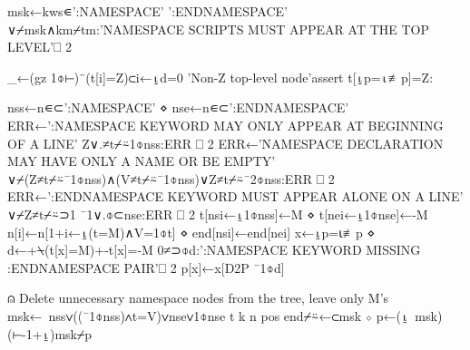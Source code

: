 \documentclass{article}%
\begin{document}
\nwenddocs{}\endmoddef\nwstartdeflinemarkup{}\nwenddeflinemarkup
msk←kws∊':NAMESPACE' ':ENDNAMESPACE'
∨⌿msk∧km⌿tm:'NAMESPACE SCRIPTS MUST APPEAR AT THE TOP LEVEL'⎕ 2
\nwendcode{}\nwdocspar

\nwenddocs{}\endmoddef\nwstartdeflinemarkup{}\nwenddeflinemarkup
_←(gz 1⌽⊢)¨(t[i]=Z)⊂i←⍸d=0
'Non-Z top-level node'assert t[⍸p=⍳≢p]=Z:
\nwendcode{}\nwdocspar

\nwenddocs{}\endmoddef\nwstartdeflinemarkup{}\nwenddeflinemarkup
nss←n∊⊂':NAMESPACE' ⋄ nse←n∊⊂':ENDNAMESPACE'
ERR←':NAMESPACE KEYWORD MAY ONLY APPEAR AT BEGINNING OF A LINE'
Z∨.≠t⌿⍨1⌽nss:ERR ⎕ 2
ERR←'NAMESPACE DECLARATION MAY HAVE ONLY A NAME OR BE EMPTY'
∨⌿(Z≠t⌿⍨¯1⌽nss)∧(V≠t⌿⍨¯1⌽nss)∨Z≠t⌿⍨¯2⌽nss:ERR ⎕ 2
ERR←':ENDNAMESPACE KEYWORD MUST APPEAR ALONE ON A LINE'
∨⌿Z≠t⌿⍨⊃1 ¯1∨.⌽⊂nse:ERR ⎕ 2
t[nsi←⍸1⌽nss]←M ⋄ t[nei←⍸1⌽nse]←-M
n[i]←n[1+i←⍸(t=M)∧V=1⌽t] ⋄ end[nsi]←end[nei]
x←⍸p=⍳≢p ⋄ d←+⍀(t[x]=M)+-t[x]=-M
0≠⊃⌽d:':NAMESPACE KEYWORD MISSING :ENDNAMESPACE PAIR'⎕ 2
p[x]←x[D2P ¯1⌽d]

⍝ Delete unnecessary namespace nodes from the tree, leave only M's
msk←~nss∨((¯1⌽nss)∧t=V)∨nse∨1⌽nse
t k n pos end⌿⍨←⊂msk ⋄ p←(⍸~msk)(⊢-1+⍸)msk⌿p
\nwendcode{}\nwdocspar
\end{document}
